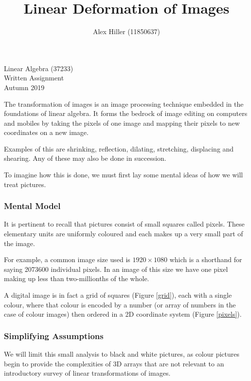 \documentclass{article}
\author{Alex Hiller (11850637)}
\title{Linear Deformation of Images}
\begin{document}
\maketitle
\vspace{20mm}
\begin{center} {Linear Algebra (37233)\\ Written Assignment\\ Autumn 2019} \end{center}
\clearpage

The transformation of images is an image processing technique embedded in the
foundations of linear algebra. It forms the bedrock of image editing on
computers and mobiles by taking the pixels of one image and mapping their
pixels to new coordinates on a new image.

Examples of this are shrinking, reflection, dilating, stretching, displacing and
shearing. Any of these may also be done in succession.

To imagine how this is done, we must first lay some mental ideas of how we will
treat pictures.

\subsubsection{Mental Model} 

It is pertinent to recall that pictures consist of small squares
called pixels. These elementary units are uniformly coloured and each makes
up a very small part of the image. 

For example, a common image size used is $ 1920 \times 1080 $ which is a 
shorthand for saying 2073600 individual pixels. In an image of this size we have
one pixel making up less than two-millionths of the whole.

A digital image is in fact a grid of squares (Figure \ref{grid}), each with 
a single 
colour, where that colour is encoded by a number (or array of numbers in 
the case of colour images) then ordered in a 2D coordinate system (Figure
\ref{pixels}).

\subsubsection{Simplifying Assumptions} 

We will limit this small analysis to black and white pictures, as colour pictures
begin to provide the complexities of 3D arrays that are not relevant to an 
introductory survey of linear transformations of images.
\end{document}
